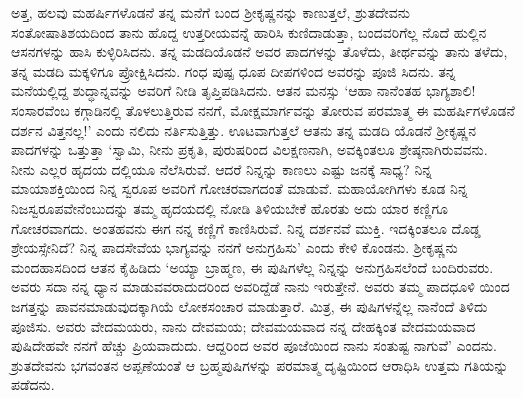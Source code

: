 ಅತ್ತ, ಹಲವು ಮಹರ್ಷಿಗಳೊಡನೆ ತನ್ನ ಮನೆಗೆ ಬಂದ ಶ್ರೀಕೃಷ್ಣನನ್ನು ಕಾಣುತ್ತಲೆ, ಶ್ರುತದೇವನು ಸಂತೋಷಾತಿಶಯದಿಂದ ತಾನು ಹೊದ್ದ ಉತ್ತರೀಯವನ್ನೆ ಹಾರಿಸಿ ಕುಣಿದಾಡುತ್ತಾ, ಬಂದವರಿಗೆಲ್ಲ ನೊದೆ ಹುಲ್ಲಿನ ಆಸನಗಳನ್ನು ಹಾಸಿ ಕುಳ್ಳಿರಿಸಿದನು. ತನ್ನ ಮಡದಿಯೊಡನೆ ಅವರ ಪಾದಗಳನ್ನು ತೊಳೆದು, ತೀರ್ಥವನ್ನು ತಾನು ತಳೆದು, ತನ್ನ ಮಡದಿ ಮಕ್ಕಳಿಗೂ ಪ್ರೋಕ್ಷಿಸಿದನು. ಗಂಧ ಪುಷ್ಪ ಧೂಪ ದೀಪಗಳಿಂದ ಅವರನ್ನು ಪೂಜಿ ಸಿದನು. ತನ್ನ ಮನೆಯಲ್ಲಿದ್ದ ಶುದ್ಧಾನ್ನವನ್ನು ಅವರಿಗೆ ನೀಡಿ ತೃಪ್ತಿಪಡಿಸಿದನು. ಆತನ ಮನಸ್ಸು ‘ಆಹಾ ನಾನೆಂತಹ ಭಾಗ್ಯಶಾಲಿ! ಸಂಸಾರವೆಂಬ ಕಗ್ಗಾಡಿನಲ್ಲಿ ತೊಳಲುತ್ತಿರುವ ನನಗೆ, ಮೋಕ್ಷಮಾರ್ಗವನ್ನು ತೋರುವ ಪರಮಾತ್ಮ ಈ ಮಹರ್ಷಿಗಳೊಡನೆ ದರ್ಶನ ವಿತ್ತನಲ್ಲ!’ ಎಂದು ನಲಿದು ನರ್ತಿಸುತ್ತಿತ್ತು. ಊಟವಾಗುತ್ತಲೆ ಆತನು ತನ್ನ ಮಡದಿ ಯೊಡನೆ ಶ್ರೀಕೃಷ್ಣನ ಪಾದಗಳನ್ನು ಒತ್ತುತ್ತಾ ‘ಸ್ವಾಮಿ, ನೀನು ಪ್ರಕೃತಿ, ಪುರುಷರಿಂದ ವಿಲಕ್ಷಣನಾಗಿ, ಅವಕ್ಕಿಂತಲೂ ಶ್ರೇಷ್ಠನಾಗಿರುವವನು. ನೀನು ಎಲ್ಲರ ಹೃದಯ ದಲ್ಲಿಯೂ ನೆಲೆಸಿರುವೆ. ಆದರೆ ನಿನ್ನನ್ನು ಕಾಣಲು ಎಷ್ಟು ಜನಕ್ಕೆ ಸಾಧ್ಯ? ನಿನ್ನ ಮಾಯಾಶಕ್ತಿಯಿಂದ ನಿನ್ನ ಸ್ವರೂಪ ಅವರಿಗೆ ಗೋಚರವಾಗದಂತೆ ಮಾಡುವೆ. ಮಹಾಯೋಗಿಗಳು ಕೂಡ ನಿನ್ನ ನಿಜಸ್ವರೂಪವೇನೆಂಬುದನ್ನು ತಮ್ಮ ಹೃದಯದಲ್ಲಿ ನೋಡಿ ತಿಳಿಯಬೇಕೆ ಹೊರತು ಅದು ಯಾರ ಕಣ್ಣಿಗೂ ಗೋಚರವಾಗದು. ಅಂತಹವನು ಈಗ ನನ್ನ ಕಣ್ಣಿಗೆ ಕಾಣಿಸಿರುವೆ. ನಿನ್ನ ದರ್ಶನವೆ ಮುಕ್ತಿ. ಇದಕ್ಕಿಂತಲೂ ದೊಡ್ಡ ಶ್ರೇಯಸ್ಸೇನಿದೆ? ನಿನ್ನ ಪಾದಸೇವೆಯ ಭಾಗ್ಯವನ್ನು ನನಗೆ ಅನುಗ್ರಹಿಸು’ ಎಂದು ಕೇಳಿ ಕೊಂಡನು. ಶ್ರೀಕೃಷ್ಣನು ಮಂದಹಾಸದಿಂದ ಆತನ ಕೈಹಿಡಿದು ‘ಅಯ್ಯಾ ಬ್ರಾಹ್ಮಣ, ಈ ಪುಷಿಗಳೆಲ್ಲ ನಿನ್ನನ್ನು ಅನುಗ್ರಹಿಸಲೆಂದೆ ಬಂದಿರುವರು. ಅವರು ಸದಾ ನನ್ನ ಧ್ಯಾನ ಮಾಡುವವರಾದುದರಿಂದ ಅವರಿದ್ದೆಡೆ ನಾನು ಇರುತ್ತೇನೆ. ಅವರು ತಮ್ಮ ಪಾದಧೂಳಿ ಯಿಂದ ಜಗತ್ತನ್ನು ಪಾವನಮಾಡುವುದಕ್ಕಾಗಿಯೆ ಲೋಕಸಂಚಾರ ಮಾಡುತ್ತಾರೆ. ಮಿತ್ರ, ಈ ಪುಷಿಗಳನ್ನೆಲ್ಲ ನಾನೆಂದೆ ತಿಳಿದು ಪೂಜಿಸು. ಅವರು ವೇದಮಯರು, ನಾನು ದೇವಮಯ; ದೇವಮಯವಾದ ನನ್ನ ದೇಹಕ್ಕಿಂತ ವೇದಮಯವಾದ ಪುಷಿದೇಹವೇ ನನಗೆ ಹೆಚ್ಚು ಪ್ರಿಯವಾದುದು. ಆದ್ದರಿಂದ ಅವರ ಪೂಜೆಯಿಂದ ನಾನು ಸಂತುಷ್ಟ ನಾಗುವೆ’ ಎಂದನು. ಶ್ರುತದೇವನು ಭಗವಂತನ ಅಪ್ಪಣೆಯಂತೆ ಆ ಬ್ರಹ್ಮಪುಷಿಗಳನ್ನು ಪರಮಾತ್ಮ ದೃಷ್ಟಿಯಿಂದ ಆರಾಧಿಸಿ ಉತ್ತಮ ಗತಿಯನ್ನು ಪಡೆದನು.

